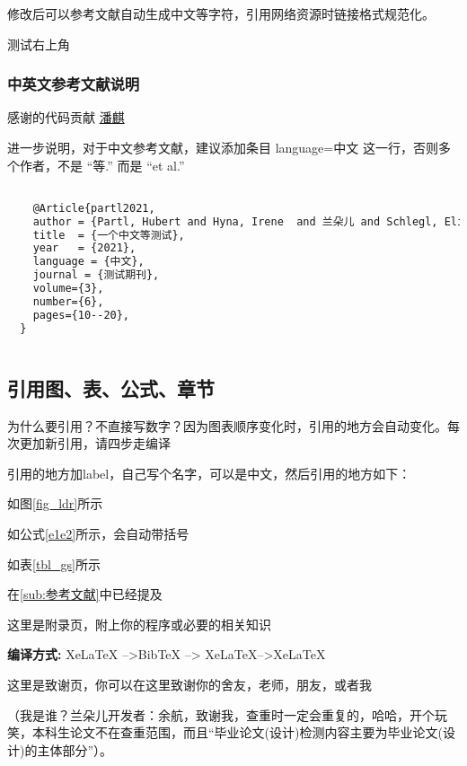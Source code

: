 \documentclass[AutoFakeBold]{LZUThesis}
\begin{document}
修改后可以参考文献自动生成中文等字符\cite{partl2021}\cite{partl2022}\cite{partl2022-2}，引用网络资源时链接格式规范化\cite{intelnewsroomIntelUnveils12th2021,wilsonHistoryDevelopmentParallel1994}。

测试右上角 

\subsubsection{中英文参考文献说明} %

感谢的代码贡献
\href{https://gitee.com/versemonger}{潘麒}

进一步说明，对于中文参考文献，建议添加条目 language={中文} 这一行，否则多个作者，不是 “等.”\cite{partl2021} 而是 “et al.”\cite{partl2016}
\begin{lstlisting}[language = tex]

    @Article{partl2021,
    author = {Partl, Hubert and Hyna, Irene  and 兰朵儿 and Schlegl, Elisabeth},
    title  = {一个中文等测试},
    year   = {2021},
    language = {中文},
    journal = {测试期刊},
    volume={3},
    number={6},
    pages={10--20},
  }
  
\end{lstlisting}




\subsection{引用图、表、公式、章节} %

为什么要引用？不直接写数字？因为图表顺序变化时，引用的地方会自动变化。每次更加新引用，请四步走编译

引用的地方加label，自己写个名字，可以是中文，然后引用的地方如下：

如图\ref{fig_ldr}所示

如公式\eqref{e1e2}所示，会自动带括号

如表\ref{tbl_gs}所示

在\ref{sub:参考文献}中已经提及


\backmatter


\printbib



\Appendix


这里是附录页，附上你的程序或必要的相关知识

{\bfseries 编译方式:} XeLaTeX -->BibTeX --> XeLaTeX-->XeLaTeX


\Thanks

这里是致谢页，你可以在这里致谢你的舍友，老师，朋友，或者我

（我是谁？兰朵儿开发者：余航，致谢我，查重时一定会重复的，哈哈，开个玩笑，本科生论文不在查重范围，而且“毕业论文(设计)检测内容主要为毕业论文(设计)的主体部分”）。


\Grade %
\end{document}
